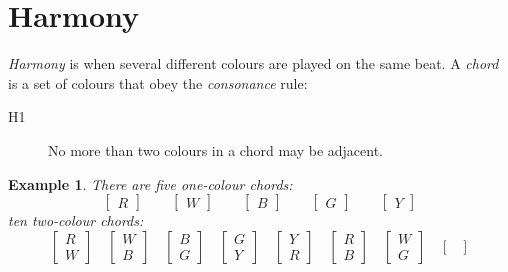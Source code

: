 \documentclass{scrartcl}
\newtheorem{example}{Example}
\begin{document}
\section{Harmony}
\emph{Harmony} is when several different colours are played on the same beat. A \emph{chord} is a set of colours that obey the \emph{consonance} rule:
\begin{description}
	\item[H1] No more than two colours in a chord may be adjacent.
\end{description}
\begin{example}
There are five one-colour chords:
\begin{equation}\nonumber
\begin{bmatrix}
R
\end{bmatrix}
\qquad
\begin{bmatrix}
W
\end{bmatrix}
\qquad
\begin{bmatrix}
B
\end{bmatrix}
\qquad
\begin{bmatrix}
G
\end{bmatrix}
\qquad
\begin{bmatrix}
Y
\end{bmatrix}
\end{equation}
ten two-colour chords:
\begin{equation}\nonumber
\begin{bmatrix}
R \\ W
\end{bmatrix}
\quad
\begin{bmatrix}
W \\ B
\end{bmatrix}
\quad
\begin{bmatrix}
B \\ G
\end{bmatrix}
\quad
\begin{bmatrix}
G \\ Y
\end{bmatrix}
\quad
\begin{bmatrix}
Y \\ R
\end{bmatrix}
\quad
\begin{bmatrix}
R \\ B
\end{bmatrix}
\quad
\begin{bmatrix}
W \\ G
\end{bmatrix}
\quad
\begin{bmatrix}

\end{bmatrix}
\end{equation}
\end{example}
\end{document}
